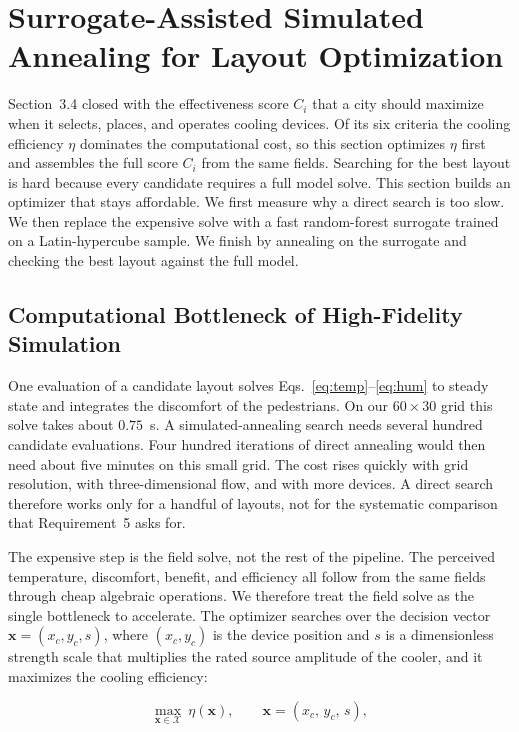 \documentclass[11pt]{article}
\begin{document}
\section{Surrogate-Assisted Simulated Annealing for Layout Optimization}

Section~3.4 closed with the effectiveness score $C_i$ that a city should
maximize when it selects, places, and operates cooling devices. Of its six
criteria the cooling efficiency $\eta$ dominates the computational cost, so this
section optimizes $\eta$ first and assembles the full score $C_i$ from the same
fields. Searching for the best layout is hard because every candidate requires a
full model solve. This section builds an optimizer that stays affordable. We first measure why a
direct search is too slow. We then replace the expensive solve with a fast
random-forest surrogate trained on a Latin-hypercube sample. We finish by
annealing on the surrogate and checking the best layout against the full model.

\subsection{Computational Bottleneck of High-Fidelity Simulation}

One evaluation of a candidate layout solves Eqs.~\eqref{eq:temp}--\eqref{eq:hum}
to steady state and integrates the discomfort of the pedestrians. On our
$60\times30$ grid this solve takes about $0.75$~s. A simulated-annealing search
needs several hundred candidate evaluations. Four hundred iterations of direct
annealing would then need about five minutes on this small grid. The cost rises
quickly with grid resolution, with three-dimensional flow, and with more
devices. A direct search therefore works only for a handful of layouts, not for
the systematic comparison that Requirement~5 asks for.

The expensive step is the field solve, not the rest of the pipeline. The
perceived temperature, discomfort, benefit, and efficiency all follow from the
same fields through cheap algebraic operations. We therefore treat the field
solve as the single bottleneck to accelerate. The optimizer searches over the
decision vector $\mathbf{x}=(x_c,y_c,s)$, where $(x_c,y_c)$ is the device
position and $s$ is a dimensionless strength scale that multiplies the rated
source amplitude of the cooler, and it maximizes the cooling efficiency:

\begin{equation}
\max_{\mathbf{x}\in\mathcal{X}}\ \eta(\mathbf{x}),
\qquad
\mathbf{x}=(x_c,\,y_c,\,s),
\label{eq:opt}
\end{equation}
\end{document}
